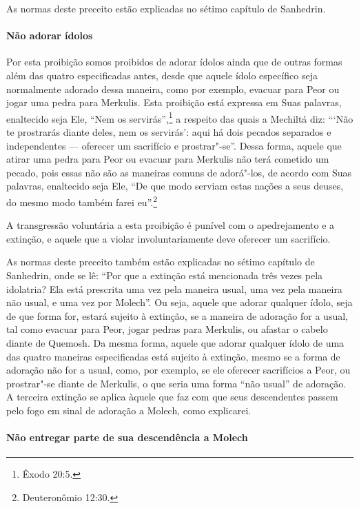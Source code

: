 \begin{multicols}{2}
As normas deste preceito estão explicadas no sétimo capítulo de Sanhedrin\starr.

\paragraph{Não adorar ídolos}

Por esta proibição somos proibidos de adorar ídolos ainda que de outras
formas além das quatro especificadas antes, desde que aquele ídolo
específico seja normalmente adorado dessa maneira, como por exemplo,
evacuar para Peor\starr{} ou jogar uma pedra para Merkulis\starr. Esta proibição está
expressa em Suas palavras, enaltecido seja Ele, ``Nem os servirás'',\footnote{Êxodo 20:5.} a respeito das quais a Mechiltá\starr{} diz: ```Não te prostrarás
diante deles, nem os servirás': aqui há dois pecados separados e
independentes --- oferecer um sacrifício e prostrar"-se''. Dessa forma,
aquele que atirar uma pedra para Peor\starr{} ou evacuar para Merkulis\starr{} não terá cometido um pecado, pois essas não são as maneiras comuns
de adorá"-los, de acordo com Suas palavras, enaltecido seja Ele, ``De que
modo serviam estas nações a seus deuses, do mesmo modo também farei eu''.\footnote{Deuteronômio 12:30.}

A transgressão voluntária a esta proibição é punível com o apedrejamento
e a extinção, e aquele que a violar involuntariamente deve oferecer um
sacrifício.

As normas deste preceito também estão explicadas no sétimo capítulo de
Sanhedrin\starr, onde se lê: ``Por que a extinção está mencionada três vezes
pela idolatria? Ela está prescrita uma vez pela maneira usual, uma vez
pela maneira não usual, e uma vez por Molech\starr''. Ou seja, aquele que
adorar qualquer ídolo, seja de que forma for, estará sujeito à extinção,
se a maneira de adoração for a usual, tal como evacuar para Peor\starr, jogar
pedras para Merkulis\starr, ou afastar o cabelo diante de Quemosh\starr. Da mesma
forma, aquele que adorar qualquer ídolo de uma das quatro maneiras
especificadas está sujeito à extinção, mesmo se a forma de adoração não
for a usual, como, por exemplo, se ele oferecer sacrifícios a Peor\starr, ou
prostrar"-se diante de Merkulis\starr, o que seria uma forma ``não usual'' de
adoração. A terceira extinção se aplica àquele que faz com que seus
descendentes passem pelo fogo em sinal de adoração a Molech\starr, como
explicarei.

\paragraph{Não entregar parte de sua descendência a Molech\starr}


\end{multicols}
